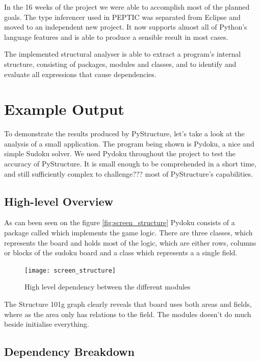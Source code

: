 \documentclass[12pt,halfparskip,DIV11,BCOR10mm]{scrreprt}
\begin{document}
In the 16 weeks of the project we were able to accomplish most of the planned goals. The type inferencer used in PEPTIC\cite{peptic2} was separated from Eclipse and moved to an independent new project. It now supports almost all of Python's language features and is able to produce a sensible result in most cases.

The implemented structural analyser is able to extract a program's internal structure, consisting of packages, modules and classes, and to identify and evaluate all expressions that cause dependencies.

\section{Example Output}

To demonstrate the results produced by PyStructure, let's take a look at the analysis of a small application. The program being shown is Pydoku, a nice and simple Sudoku solver. We used Pydoku throughout the project to test the accuracy of PyStructure. It is small enough to be comprehended in a short time, and still sufficiently complex to challenge??? most of PyStructure's capabilities.

\subsection{High-level Overview}

As can been seen on the figure \vref{fig:screen_structure} Pydoku consists of a package called  which implements the game logic. There are three classes,  which represents the board and holds most of the logic,  which are either rows, columns or blocks of the sudoku board and a class  which represents a a single field.

\begin{figure}[H]
    \centering
    \texttt{[image: screen\_structure]}
    \caption{High level dependency between the different modules}
    \label{fig:screen_structure}
\end{figure}

The Structure 101g graph clearly reveals that board uses both areas and fields, where as the area only has relations to the field. The  modules doesn't do much beside initialise everything. 

\subsection{Dependency Breakdown}
\end{document}
